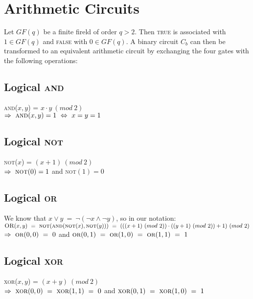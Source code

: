 \documentclass{report}
\begin{document}
	\section{Arithmetic Circuits}
	\startsection
		Let $GF(q)$ be a finite fireld of order $q > 2$. Then \textsc{true} is associated with $1 \in GF(q)$ and \textsc{false} with $0 \in GF(q)$. A binary circuit $C_b$ can then be transformed to an equivalent arithmetic circuit by exchanging the four gates with the following operations:
		\subsection{Logical \textsc{and}}
		\startsubsection
			\textsc{and}($x, y$) = $x \cdot y \ (mod \ 2)$ \\
			$\Rightarrow \ \textsc{and}(x, y) = 1 \ \Leftrightarrow \ x = y = 1$
		\closesection
		\subsection{Logical \textsc{not}}
		\startsubsection
			\textsc{not}($x$) = $(x+1) \ (mod \ 2)$ \\
			$\Rightarrow \ \textsc{not}(0) = 1$ and \textsc{not}$(1) = 0$
		\closesection
		\subsection{Logical \textsc{or}}
		\startsubsection
			We know that $x \vee y \ = \ \neg(\neg x \wedge \neg y)$, so in our notation: \\
			$\textsc{OR}(x, y) \ = \ \textsc{not}(\textsc{and}(\textsc{not}(x), \textsc{not}(y))) \ = \ (((x+1) \ (mod \ 2)) \cdot ((y+1) \ (mod \ 2)) + 1) \ (mod \ 2)$ \\
			$\Rightarrow \ \textsc{or}(0,0) \ = \ 0$ and $\textsc{or}(0, 1) \ = \ \textsc{or}(1, 0) \ = \ \textsc{or}(1, 1) \ = \ 1$
		\closesection
		\subsection{Logical \textsc{xor}}
		\startsubsection
			\textsc{xor}($x, y$) = $(x+y) \ (mod \ 2)$ \\
			$\Rightarrow \ \textsc{xor}(0, 0) \ = \ \textsc{xor}(1, 1) \ = \ 0$ and $\textsc{xor}(0, 1) \ = \ \textsc{xor}(1, 0) \ = \ 1$
		\closesection
	\closesection
	
\end{document}
